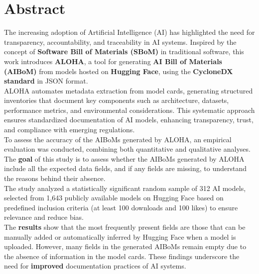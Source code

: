 \documentclass[12pt,a4paper, oneside, openright]{book}
\newcommand{\aibom}{{AIBoM}\xspace}
\newcommand{\aiboms}{{AIBoMs}\xspace}
\newcommand{\sbom}{{SBoM}\xspace}
\begin{document}
\chapter*{Abstract}
The increasing adoption of Artificial Intelligence (AI) has highlighted the need for transparency, accountability, and traceability in AI systems. Inspired by the concept of \textbf{Software Bill of Materials (\sbom)} in traditional software, this work introduces \textbf{ALOHA}, a tool for generating \textbf{AI Bill of Materials (\aibom)} from models hosted on \textbf{Hugging Face}, using the \textbf{CycloneDX standard} in JSON format.\\ 
ALOHA automates metadata extraction from model cards, generating structured inventories that document key components such as architecture, datasets, performance metrics, and environmental considerations. This systematic approach ensures standardized documentation of AI models, enhancing transparency, trust, and compliance with emerging regulations.\\
To assess the accuracy of the \aiboms generated by ALOHA, an empirical evaluation was conducted, combining both quantitative and qualitative analyses. 
The \textbf{goal} of this study is to assess whether the \aiboms generated by ALOHA include all the expected data fields, and if any fields are missing, to understand the reasons behind their absence. \\The study analyzed a statistically significant random sample of 312 AI models, selected from 1,643 publicly available models on Hugging Face based on predefined inclusion criteria (at least 100 downloads and 100 likes) to ensure relevance and reduce bias.\\
The \textbf{results} show that the most frequently present fields are those that can be manually added or automatically inferred by Hugging Face when a model is uploaded. However, many fields in the generated \aiboms remain empty due to the absence of information in the model cards. 
These findings underscore the need for \textbf{improved} documentation practices of AI systems.\\ 

\end{document}
